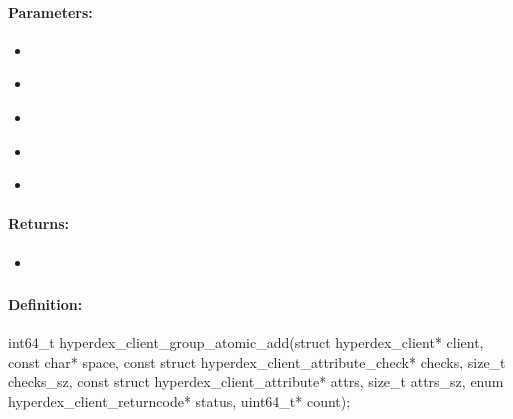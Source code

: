 \paragraph{Parameters:}
\begin{itemize}[noitemsep]
\item {}\\

\item {}\\

\item {}\\

\item {}\\

\item {}\\

\end{itemize}

\paragraph{Returns:}
\begin{itemize}[noitemsep]
\item {}\\

\end{itemize}

\pagebreak
\subsubsection{}
\label{api:c:group_atomic_add}


\paragraph{Definition:}
\begin{ccode}
int64_t hyperdex_client_group_atomic_add(struct hyperdex_client* client,
        const char* space,
        const struct hyperdex_client_attribute_check* checks, size_t checks_sz,
        const struct hyperdex_client_attribute* attrs, size_t attrs_sz,
        enum hyperdex_client_returncode* status,
        uint64_t* count);
\end{ccode}

